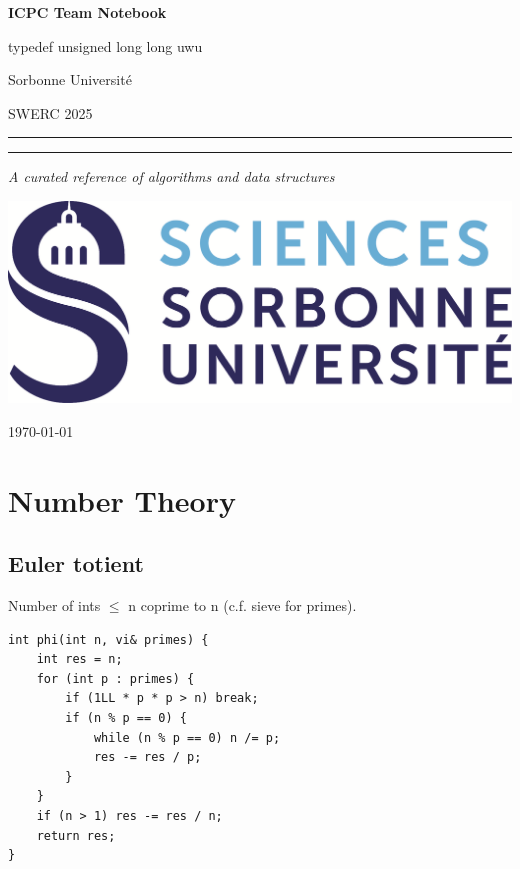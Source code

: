 \documentclass[10pt,a4paper]{article}
\begin{document}
\begin{titlepage}
  \centering

  \vspace*{2cm}
  {\Huge\bfseries ICPC Team Notebook\par}
  \vspace{1cm}

  {\Large {typedef unsigned long long uwu}\par}
  {\Large {Sorbonne Université}\par}
  {\Large SWERC 2025\par}
  \vspace{1.5cm}

  \rule{\linewidth}{1.5pt}\par
  \vspace{0.5cm}
  \rule{\linewidth}{0.5pt}\par
  \vspace{1.5cm}

  {\LARGE \itshape A curated reference of algorithms and data structures\par}
  \vspace{1cm}

  \includegraphics[width=0.2 \textwidth]{img/logo.png}\par
  \vspace{1cm}

  {\large \today\par}

  \clearpage
\end{titlepage}


\clearpage
\tableofcontents

\twocolumn

\section{Number Theory}

\subsection{Euler totient}

Number of ints $\leq$ n coprime to n (c.f. sieve for primes).
\begin{verbatim}
int phi(int n, vi& primes) {
    int res = n;
    for (int p : primes) {
        if (1LL * p * p > n) break;
        if (n % p == 0) {
            while (n % p == 0) n /= p;
            res -= res / p;
        }
    }
    if (n > 1) res -= res / n;
    return res;
}
\end{verbatim}
\end{document}
